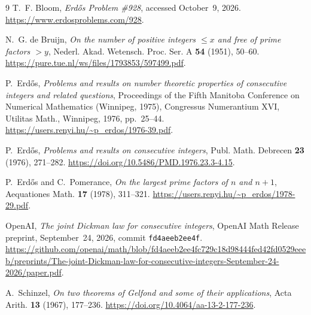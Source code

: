 \documentclass[11pt,a4paper]{amsart}
\begin{document}
\begin{thebibliography}{9}
T.~F. Bloom, \emph{Erd\H{o}s Problem \#928},
accessed October~9, 2026.
\newline\url{https://www.erdosproblems.com/928}.

N.~G. de Bruijn, \emph{On the number of positive integers $\le x$ and
free of prime factors $>y$}, Nederl. Akad. Wetensch. Proc. Ser. A
\textbf{54} (1951), 50--60.
\newline\url{https://pure.tue.nl/ws/files/1793853/597499.pdf}.

P.~Erd\H{o}s, \emph{Problems and results on number theoretic properties of
consecutive integers and related questions}, Proceedings of the Fifth
Manitoba Conference on Numerical Mathematics (Winnipeg, 1975), Congressus
Numerantium XVI, Utilitas Math., Winnipeg, 1976, pp.~25--44.
\newline\url{https://users.renyi.hu/~p_erdos/1976-39.pdf}.

P.~Erd\H{o}s, \emph{Problems and results on consecutive integers}, Publ.
Math. Debrecen \textbf{23} (1976), 271--282.
\newline\url{https://doi.org/10.5486/PMD.1976.23.3-4.15}.

P.~Erd\H{o}s and C.~Pomerance, \emph{On the largest prime factors of $n$
and $n+1$}, Aequationes Math. \textbf{17} (1978), 311--321.
\newline\url{https://users.renyi.hu/~p_erdos/1978-29.pdf}.

OpenAI, \emph{The joint Dickman law for consecutive integers}, OpenAI
Math Release preprint, September~24, 2026, commit
\texttt{fd4aeeb2ee4f}.
\newline\url{https://github.com/openai/math/blob/fd4aeeb2ee4fc729c18d98444fed42fd0529eeeb/preprints/The-joint-Dickman-law-for-consecutive-integers-September-24-2026/paper.pdf}.

A.~Schinzel, \emph{On two theorems of Gelfond and some of their
applications}, Acta Arith. \textbf{13} (1967), 177--236.
\newline\url{https://doi.org/10.4064/aa-13-2-177-236}.
\end{thebibliography}
\end{document}
